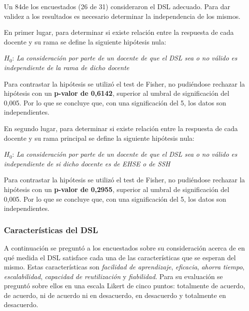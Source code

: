 Un 84\percentage{ }de los encuestados (26 de 31) consideraron el DSL adecuado. Para dar validez a los resultados es necesario determinar la independencia de los mismos.

En primer lugar, para determinar si existe relación entre la respuesta de cada docente y su rama se define la siguiente hipótesis nula:

\medskip
\begin{mdframed}[style=hipotesis0]
$H_0$: \emph{La consideración por parte de un docente de que el DSL sea o no válido es independiente de la rama de dicho docente}
\end{mdframed}

\medskip
Para contrastar la hipótesis se utilizó el test de Fisher, no pudiéndose rechazar la hipótesis con un \textbf{p-valor de 0,6142}, superior al umbral de significación del 0,005. Por lo que se concluye que, con una significación del 5\percentage, los datos son independientes.

En segundo lugar, para determinar si existe relación entre la respuesta de cada docente y su rama principal se define la siguiente hipótesis nula:

\medskip
\begin{mdframed}[style=hipotesis0]
$H_0$: \emph{La consideración por parte de un docente de que el DSL sea o no válido es independiente de si  dicho docente es de EHSE o de SSH}
\end{mdframed}

\medskip
Para contrastar la hipótesis se utilizó el test de Fisher, no pudiéndose rechazar la hipótesis con un \textbf{p-valor de 0,2955}, superior al umbral de significación del 0,005. Por lo que se concluye que, con una significación del 5\percentage, los datos son independientes.

\subsubsection{Características del DSL}

A continuación se preguntó a los encuestados sobre su consideración acerca de en qué medida el DSL satisface cada una de las características que se esperan del mismo. Estas características son \emph{facilidad de aprendizaje}, \emph{eficacia}, \emph{ahorra tiempo}, \emph{escalabilidad}, \emph{capacidad de reutilización} y \emph{fiabilidad}. Para su evaluación se preguntó sobre ellos en una escala Likert de cinco puntos: totalmente de acuerdo, de acuerdo, ni de acuerdo ni en desacuerdo, en desacuerdo y totalmente en desacuerdo. 

